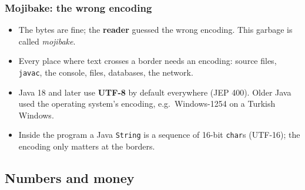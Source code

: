 \documentclass[aspectratio=169,10pt,compress]{beamer}
\begin{document}
\begin{frame}[t,fragile] \frametitle{Mojibake: the wrong encoding}
  \begin{center}
  \end{center}
  \begin{itemize}\small
    \item The bytes are fine; the \textbf{reader} guessed the wrong encoding. This garbage is called \emph{mojibake}.
    \item Every place where text crosses a border needs an encoding: source files, \texttt{javac},
      the console, files, databases, the network.
    \item Java 18 and later use \textbf{UTF-8} by default everywhere (JEP 400). Older Java used the
      operating system's encoding, e.g.\ Windows-1254 on a Turkish Windows.
    \item Inside the program a Java \texttt{String} is a sequence of 16-bit \texttt{char}s (UTF-16);
      the encoding only matters at the borders.
  \end{itemize}
\end{frame}


\subsection[Numbers]{Numbers and money}
\end{document}
